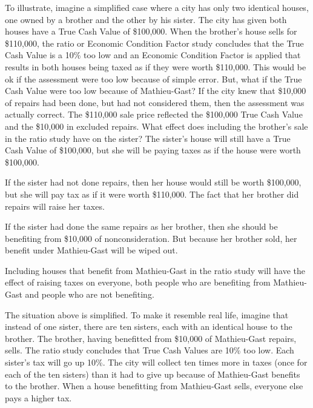 \documentclass[12pt,\documentclassflag]{michiganCourtOfAppealsBrief}
\begin{document}
To illustrate, imagine a simplified case where a city has only two identical houses, one owned by a brother and the other by his sister. The city has given both houses have a True Cash Value of \$100,000. When the brother's house sells for \$110,000, the ratio or Economic Condition Factor study concludes that the True Cash Value is a 10\% too low and an Economic Condition Factor is applied that results in both houses being taxed as if they were worth \$110,000. This would be ok if the assessment were too low because of simple error. But, what if the True Cash Value were too low because of Mathieu-Gast? If the city knew that \$10,000 of repairs had been done, but had not considered them, then the assessment was actually correct. The \$110,000 sale price reflected the \$100,000 True Cash Value and the \$10,000 in excluded repairs. What effect does including the brother's sale in the ratio study  have on the sister? The sister's house will still have a True Cash Value of \$100,000, but she will be paying taxes as if the house were worth \$100,000.

If the sister had not done repairs, then her house would still be worth \$100,000, but she will pay tax as if it were worth \$110,000. The fact that her brother did repairs will raise her taxes.

If the sister had done the same repairs as her brother, then she should be benefiting from \$10,000 of nonconsideration. But because her brother sold, her benefit under Mathieu-Gast will be wiped out.

Including houses that benefit from Mathieu-Gast in the ratio study will have the effect of raising taxes on everyone, both people who are benefiting from Mathieu-Gast and people who are not benefiting.

The situation above is simplified. To make it resemble real life, imagine that instead of one sister, there are ten sisters, each with an identical house to the brother. The brother, having benefitted from \$10,000 of Mathieu-Gast repairs, sells. The ratio study concludes that True Cash Values are 10\% too low. Each sister's tax will go up 10\%. The city will collect ten times more in taxes (once for each of the ten sisters) than it had to give up because of Mathieu-Gast benefits to the brother. When a house benefitting from Mathieu-Gast sells, everyone else pays a higher tax.
\end{document}
